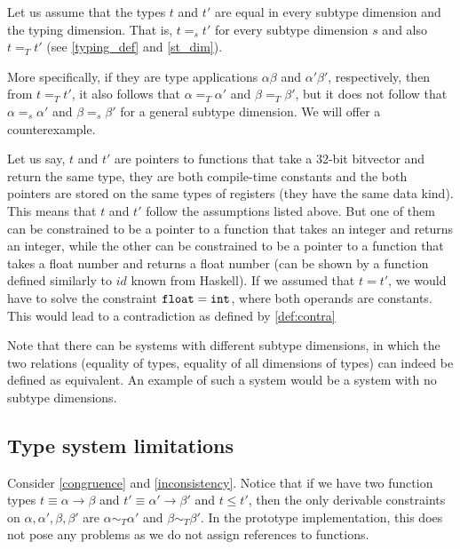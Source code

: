 \begin{ex}
    \label{inconsistency}
    Let us assume that the types $t$ and $t'$ are equal in every subtype dimension and the typing dimension. That is, $t =_s t'$ for every subtype dimension $s$ and also $t =_T t'$ (see \cref{typing_def} and \cref{st_dim}).

    More specifically, if they are type applications $\alpha \beta$ and $\alpha' \beta'$, respectively, then from $t =_T t'$, it also follows that $\alpha =_T \alpha'$ and $\beta =_T \beta'$, but it does not follow that $\alpha =_s \alpha'$ and $\beta =_s \beta'$ for a general subtype dimension. We will offer a counterexample.

    Let us say, $t$ and $t'$ are pointers to functions that take a 32-bit bitvector and return the same type, they are both compile-time constants and the both pointers are stored on the same types of registers (they have the same data kind). This means that $t$ and $t'$ follow the assumptions listed above. But one of them can be constrained to be a pointer to a function that takes an integer and returns an integer, while the other can be constrained to be a pointer to a function that takes a float number and returns a float number (can be shown by a function defined similarly to $id$ known from Haskell). If we assumed that $t = t'$, we would have to solve the constraint $\mathtt{float} = \mathtt{int}$, where both operands are constants. This would lead to a contradiction as defined by \cref{def:contra}

    Note that there can be systems with different subtype dimensions, in which the two relations (equality of types, equality of all dimensions of types) can indeed be defined as equivalent. An example of such a system would be a system with no subtype dimensions.
\end{ex}

\subsection{Type system limitations}

Consider \cref{congruence} and \cref{inconsistency}. Notice that if we have two function types $t \equiv \alpha \to \beta$ and $t' \equiv \alpha' \to \beta'$ and $t \leq t'$, then the only derivable constraints on $\alpha, \alpha', \beta, \beta'$ are $\alpha \sim_T \alpha'$ and $\beta \sim_T \beta'$. In the prototype implementation, this does not pose any problems as we do not assign references to functions.

